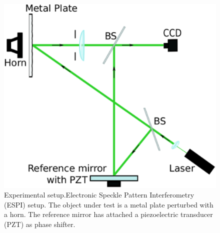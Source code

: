 \begin{figure}[th!]
	\begin{center}
		\includegraphics[scale=0.2]{Chpt3_figures/fig_2.eps}
	\end{center}
	\caption{Experimental setup.Electronic Speckle Pattern Interferometry
	(ESPI) setup. The object under test is a metal plate perturbed with a
	horn. The reference mirror has attached a piezoelectric transducer
	(PZT) as phase shifter.} 
	\label{fig:ExperimentalSetupRAPS}
\end{figure}

